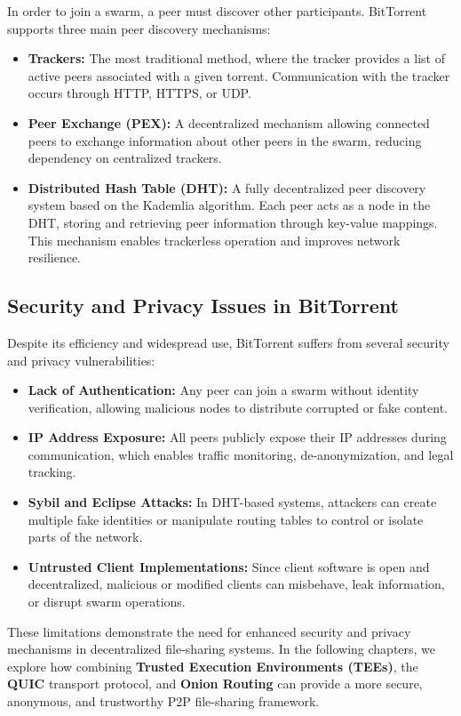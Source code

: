 In order to join a swarm, a peer must discover other participants. BitTorrent supports three main peer discovery mechanisms:

\begin{itemize}
  \item \textbf{Trackers:} The most traditional method, where the tracker provides a list of active peers associated with a given torrent. Communication with the tracker occurs through HTTP, HTTPS, or UDP.
  \item \textbf{Peer Exchange (PEX):} A decentralized mechanism allowing connected peers to exchange information about other peers in the swarm, reducing dependency on centralized trackers.
  \item \textbf{Distributed Hash Table (DHT):} A fully decentralized peer discovery system based on the Kademlia algorithm. Each peer acts as a node in the DHT, storing and retrieving peer information through key-value mappings. This mechanism enables trackerless operation and improves network resilience.
\end{itemize}

\subsection{Security and Privacy Issues in BitTorrent}
\label{issues_bittorrent}

Despite its efficiency and widespread use, BitTorrent suffers from several security and privacy vulnerabilities:

\begin{itemize}
  \item \textbf{Lack of Authentication:} Any peer can join a swarm without identity verification, allowing malicious nodes to distribute corrupted or fake content.
  \item \textbf{IP Address Exposure:} All peers publicly expose their IP addresses during communication, which enables traffic monitoring, de-anonymization, and legal tracking.
  \item \textbf{Sybil and Eclipse Attacks:} In DHT-based systems, attackers can create multiple fake identities or manipulate routing tables to control or isolate parts of the network.
  \item \textbf{Untrusted Client Implementations:} Since client software is open and decentralized, malicious or modified clients can misbehave, leak information, or disrupt swarm operations.
\end{itemize}

These limitations demonstrate the need for enhanced security and privacy mechanisms in decentralized file-sharing systems. In the following chapters, we explore how combining \textbf{Trusted Execution Environments (TEEs)}, the \textbf{QUIC} transport protocol, and \textbf{Onion Routing} can provide a more secure, anonymous, and trustworthy P2P file-sharing framework.
